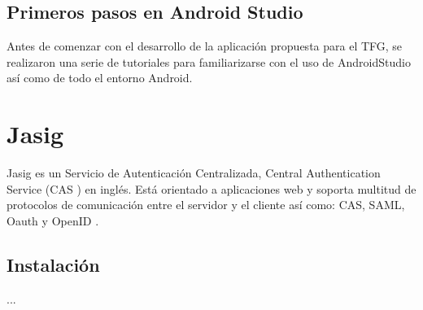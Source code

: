 \subsection{Primeros pasos en Android Studio}

Antes de comenzar con el desarrollo de la aplicación propuesta para el TFG, se realizaron una serie de tutoriales \cite{URL::GettingStarted, URL::SavingData} para familiarizarse con el uso de AndroidStudio así como de todo el entorno Android.

\section{Jasig}

Jasig \cite{URL::Jasig} es un Servicio de Autenticación Centralizada, Central Authentication Service (CAS \cite{URL::CAS}) en inglés.  
Está orientado a aplicaciones web y soporta multitud de protocolos de comunicación entre el servidor y el cliente así como: 
CAS, SAML, Oauth \cite{URL::Oauth} y OpenID \cite{URL::OpenID}.

\subsection{Instalación}
...


